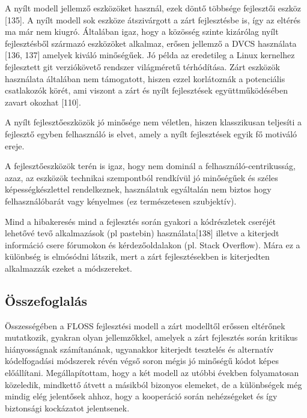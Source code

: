 \documentclass[12pt,magyar,a4paper,oneside]{scrreprt}
\begin{document}
A nyílt modell jellemző eszközöket használ, ezek döntő többsége
fejlesztői eszköz {[}135{]}. A nyílt modell sok eszköze átszivárgott a
zárt fejlesztésbe is, így az eltérés ma már nem kiugró. Általában igaz,
hogy a közösség szinte kizárólag nyílt fejlesztésből származó eszközöket
alkalmaz, erősen jellemző a DVCS használata {[}136, 137{]} amelyek
kiváló minőségűek. Jó példa az eredetileg a Linux kernelhez fejlesztett
git verziókövető rendszer világméretű térhódítása. Zárt eszközök
használata általában nem támogatott, hiszen ezzel korlátoznák a
potenciális csatlakozók körét, ami viszont a zárt és nyílt fejlesztések
együttműködésében zavart okozhat {[}110{]}.

A nyílt fejlesztőeszközök jó minősége nem véletlen, hiszen klasszikusan
teljesíti a fejlesztő egyben felhasználó is elvet, amely a nyílt
fejlesztések egyik fő motiváló ereje.

A fejlesztőeszközök terén is igaz, hogy nem dominál a
felhasználó-centrikusság, azaz, az eszközök technikai szempontból
rendkívül jó minőségűek és széles képességkészlettel rendelkeznek,
használatuk egyáltalán nem biztos hogy felhasználóbarát vagy kényelmes
(ez természetesen szubjektív).

Mind a hibakeresés mind a fejlesztés során gyakori a kódrészletek
cseréjét lehetővé tevő alkalmazások (pl pastebin) használata{[}138{]}
illetve a kiterjedt információ csere fórumokon és kérdezőoldalakon (pl.
Stack Overflow). Mára ez a különbség is elmósódni látszik, mert a zárt
fejlesztésekben is kiterjedten alkalmazzák ezeket a módszereket.

\hypertarget{uxf6sszefoglaluxe1s}{%
\subsection{Összefoglalás}\label{uxf6sszefoglaluxe1s}}

Összességében a FLOSS fejlesztési modell a zárt modelltől erőssen
eltérőnek mutatkozik, gyakran olyan jellemzőkkel, amelyek a zárt
fejlesztés során kritikus hiányosságnak számítanának, ugyanakkor
kiterjedt tesztelés és alternatív kódelfogadási módszerek révén végső
soron mégis jó minőségű kódot képes előállítani. Megállapítottam, hogy a
két modell az utóbbi években folyamatosan közeledik, mindkettő átvett a
másikból bizonyos elemeket, de a különbségek még mindig elég jelentősek
ahhoz, hogy a kooperáció során nehézségeket és így biztonsági kockázatot
jelentsenek.
\end{document}
